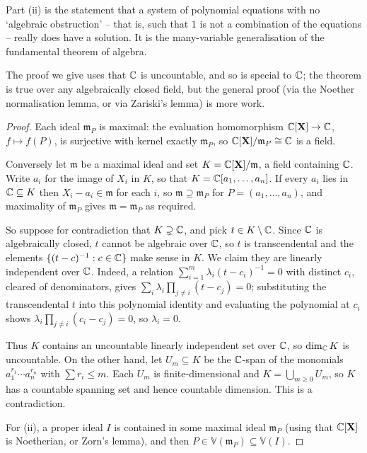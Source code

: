 \documentclass[a4paper]{scrartcl}
\newcommand{\V}{\mathbb{V}}
\newcommand{\mm}{\mathfrak{m}}
\begin{document}
Part (ii) is the statement that a system of polynomial equations with no `algebraic obstruction' -- that is, such that $1$ is not a combination of the equations -- really does have a solution. It is the many-variable generalisation of the fundamental theorem of algebra.

The proof we give uses that $\mathbb{C}$ is uncountable, and so is special to $\mathbb{C}$; the theorem is true over any algebraically closed field, but the general proof (via the Noether normalisation lemma, or via Zariski's lemma) is more work.

\begin{proof}
	Each ideal $\mm_P$ is maximal: the evaluation homomorphism $\mathbb{C}[\mathbf{X}] \to \mathbb{C}$, $f \mapsto f(P)$, is surjective with kernel exactly $\mm_P$, so $\C[\mathbf{X}]/\mm_P \cong \C$ is a field.

	Conversely let $\mm$ be a maximal ideal and set $K = \C[\mathbf{X}]/\mm$, a field containing $\mathbb{C}$. Write $a_i$ for the image of $X_i$ in $K$, so that $K = \mathbb{C}[a_1,\dots,a_n]$. If every $a_i$ lies in $\mathbb{C} \subseteq K$ then $X_i - a_i \in \mm$ for each $i$, so $\mm \supseteq \mm_P$ for $P = (a_1,\dots,a_n)$, and maximality of $\mm_P$ gives $\mm = \mm_P$ as required.

	So suppose for contradiction that $K \supsetneq \mathbb{C}$, and pick $t \in K \setminus \mathbb{C}$. Since $\mathbb{C}$ is algebraically closed, $t$ cannot be algebraic over $\mathbb{C}$, so $t$ is transcendental and the elements $\{(t-c)^{-1} : c \in \mathbb{C}\}$ make sense in $K$. We claim they are linearly independent over $\mathbb{C}$. Indeed, a relation $\sum_{i=1}^m \lambda_i (t-c_i)^{-1} = 0$ with distinct $c_i$, cleared of denominators, gives $\sum_i \lambda_i \prod_{j\neq i}(t - c_j) = 0$; substituting the transcendental $t$ into this polynomial identity and evaluating the polynomial at $c_i$ shows $\lambda_i \prod_{j \neq i}(c_i - c_j) = 0$, so $\lambda_i = 0$.

	Thus $K$ contains an uncountable linearly independent set over $\mathbb{C}$, so $\dim_{\mathbb{C}} K$ is uncountable. On the other hand, let $U_m \subseteq K$ be the $\mathbb{C}$-span of the monomials $a_1^{r_1}\cdots a_n^{r_n}$ with $\sum r_i \leq m$. Each $U_m$ is finite-dimensional and $K = \bigcup_{m \geq 0} U_m$, so $K$ has a countable spanning set and hence countable dimension. This is a contradiction.

	For (ii), a proper ideal $I$ is contained in some maximal ideal $\mm_P$ (using that $\mathbb{C}[\mathbf{X}]$ is Noetherian, or Zorn's lemma), and then $P \in \V(\mm_P) \subseteq \V(I)$.
\end{proof}
\end{document}
